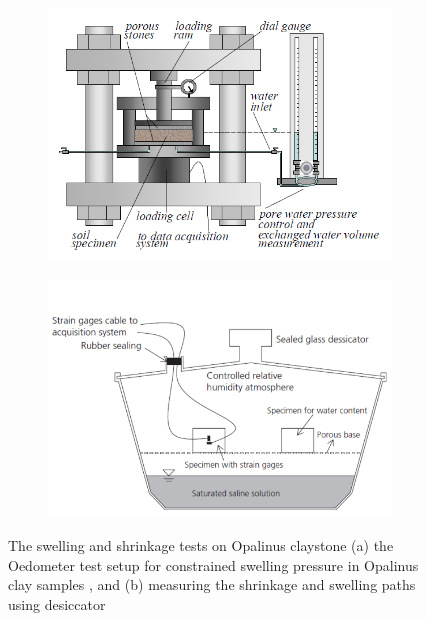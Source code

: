 \begin{figure}[!ht]
\begin{subfigure}[c]{0.48\textwidth}
\includegraphics[width=1\textwidth]{figures/Amir_Shrinkage_Swelling_Setup.png}
\subcaption{}
\label{fig:Amir_Shrinkage_Swelling_Setup}
\end{subfigure}
\hfill
\begin{subfigure}[c]{0.48\textwidth}
\includegraphics[width=1\textwidth]{figures/Amir_Shrinkage_Minardi.png}
\subcaption{}
\label{fig:Amir_Shrinkage_Minardi}
\end{subfigure}
\caption{The swelling and shrinkage tests on Opalinus claystone (a) the Oedometer test setup for constrained swelling pressure in Opalinus clay samples \cite{Peronetal2009}, and (b) measuring the shrinkage and swelling paths using desiccator \cite{Minardietal2016}}
\end{figure}

